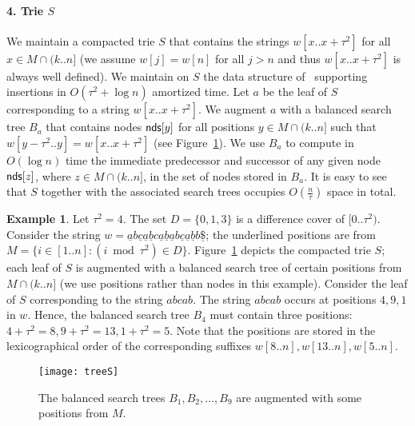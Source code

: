 \documentclass[3p,twocolumn]{elsarticle}
\theoremstyle{plain}
\theoremstyle{definition}
\newtheorem*{example}{Example}
\newcommand{\nodes}{{\sf nds}}
\begin{document}
\paragraph{4. Trie $S$} We maintain a compacted trie $S$ that contains the strings $w[x..x{+}\tau^2]$ for all $x \in M \cap (k..n]$ (we assume $w[j] = w[n]$ for all $j > n$ and thus $w[x..x{+}\tau^2]$ is always well defined). We maintain on $S$ the data structure of~\cite{FranceschiniGrossi} supporting insertions in $O(\tau^2 + \log n)$ amortized time. Let $a$ be the leaf of $S$ corresponding to a string $w[x..x{+}\tau^2]$. We augment $a$ with a balanced search tree $B_a$ that contains nodes $\nodes[y]$ for all positions $y \in M\cap (k..n]$ such that $w[y{-}\tau^2..y] = w[x..x{+}\tau^2]$ (see Figure~\ref{fig:treeS}). We use $B_a$ to compute in $O(\log n)$ time the immediate predecessor and successor of any given node $\nodes[z]$, where $z \in M \cap (k..n]$, in the set of nodes stored in $B_a$. It is easy to see that $S$ together with the associated search trees occupies $O(\frac{n}{\tau})$ space in total.

\begin{example}
Let $\tau^2 = 4$. The set $D = \{0,1,3\}$ is a difference cover of $[0..\tau^2)$. Consider the string $w = \underline{a}b\underline{c}\underline{a}\underline{b}c\underline{a}\underline{b}\underline{a}b\underline{c}
\underline{a}\underline{b}b\underline{\$}$; the underlined positions are from $M = \{i \in [1..n] \colon (i\bmod \tau^2) \in D\}$. Figure~\ref{fig:treeS} depicts the compacted trie $S$; each leaf of $S$ is augmented with a balanced search tree of certain positions from $M\cap (k..n]$ (we use positions rather than nodes in this example). Consider the leaf of $S$ corresponding to the string $abcab$. The string $abcab$ occurs at positions $4, 9, 1$ in $w$. Hence, the balanced search tree $B_4$ must contain three positions: $4{+}\tau^2 = 8, 9{+}\tau^2 = 13, 1{+}\tau^2 = 5$. Note that the positions are stored in the lexicographical order of the corresponding suffixes $w[8..n], w[13..n], w[5..n]$.
\begin{figure}[htb]
\texttt{[image: treeS]}
\caption{The balanced search trees $B_1, B_2, \ldots, B_9$ are augmented with some positions from $M$.}
\label{fig:treeS}
\end{figure}
\end{example}
\end{document}

